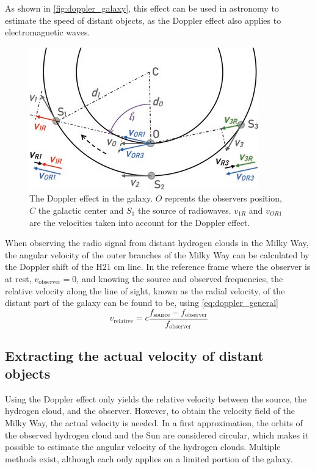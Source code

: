 As shown in \autoref{fig:doppler_galaxy}, this effect can be used in astronomy to estimate the speed of distant objects, as the Doppler effect also applies to electromagnetic waves.
\begin{figure}[htbp]
    \centering
    \includegraphics[width=0.6\linewidth]{figures/doppler_galaxy.png}
    \caption{The Doppler effect in the galaxy. $O$ reprents the observers position, $C$ the galactic center and $S_1$ the source of radiowaves. $v_{1R}$ and $v_{OR1}$ are the velocities taken into account for the Doppler effect. \cite{lauterbach_radio_2022}}
    \label{fig:doppler_galaxy}
\end{figure}
When observing the radio signal from distant hydrogen clouds in the Milky Way, the angular velocity of the outer branches of the Milky Way can be calculated by the Doppler shift of the H$21$ cm line.
In the reference frame where the observer is at rest, $v_\textrm{observer} = 0$, and knowing the source and observed frequencies, the relative velocity along the line of sight, known as the radial velocity, of the distant part of the galaxy can be found to be, using \autoref{eq:doppler_general}
\begin{equation}
    v_\textrm{relative} = c \frac{f_\textrm{source} - f_\textrm{observer}}{f_\textrm{observer}}
    \label{eq:doppler}
\end{equation}

\subsection{Extracting the actual velocity of distant objects}
\label{sec:velocity_of_clouds}
Using the Doppler effect only yields the relative velocity between the source, the hydrogen cloud, and the observer. However, to obtain the velocity field of the Milky Way, the actual velocity is needed. In a first approximation, the orbits of the observed hydrogen cloud and the Sun are considered circular, which makes it possible to estimate the angular velocity of the hydrogen clouds. Multiple methods exist, although each only applies on a limited portion of the galaxy.

